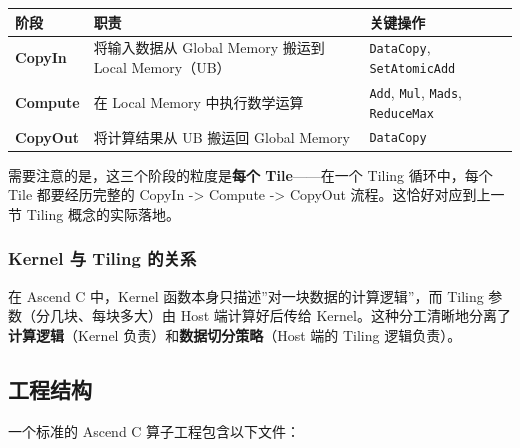 \begin{longtable}[]{@{}
  >{\raggedright\arraybackslash}p{}
  >{\raggedright\arraybackslash}p{}
  >{\raggedright\arraybackslash}p{}@{}}
\toprule\noalign{}
\begin{minipage}[b]{\linewidth}\raggedright
阶段
\end{minipage} & \begin{minipage}[b]{\linewidth}\raggedright
职责
\end{minipage} & \begin{minipage}[b]{\linewidth}\raggedright
关键操作
\end{minipage} \\
\midrule\noalign{}
\endhead
\bottomrule\noalign{}
\endlastfoot
\textbf{CopyIn} & 将输入数据从 Global Memory 搬运到 Local Memory（UB） &
\passthrough{\lstinline!DataCopy!},
\passthrough{\lstinline!SetAtomicAdd!} \\
\textbf{Compute} & 在 Local Memory 中执行数学运算 &
\passthrough{\lstinline!Add!}, \passthrough{\lstinline!Mul!},
\passthrough{\lstinline!Mads!}, \passthrough{\lstinline!ReduceMax!} \\
\textbf{CopyOut} & 将计算结果从 UB 搬运回 Global Memory &
\passthrough{\lstinline!DataCopy!} \\
\end{longtable}

需要注意的是，这三个阶段的粒度是\textbf{每个 Tile}------在一个 Tiling
循环中，每个 Tile 都要经历完整的 CopyIn -\textgreater{} Compute
-\textgreater{} CopyOut 流程。这恰好对应到上一节 Tiling 概念的实际落地。

\subsubsection{Kernel 与 Tiling 的关系}\label{src-book-chapter7-h47}

在 Ascend C 中，Kernel 函数本身只描述''对一块数据的计算逻辑''，而 Tiling
参数（分几块、每块多大）由 Host 端计算好后传给
Kernel。这种分工清晰地分离了\textbf{计算逻辑}（Kernel
负责）和\textbf{数据切分策略}（Host 端的 Tiling 逻辑负责）。

\subsection{工程结构}\label{src-book-chapter7-h48}

一个标准的 Ascend C 算子工程包含以下文件：

